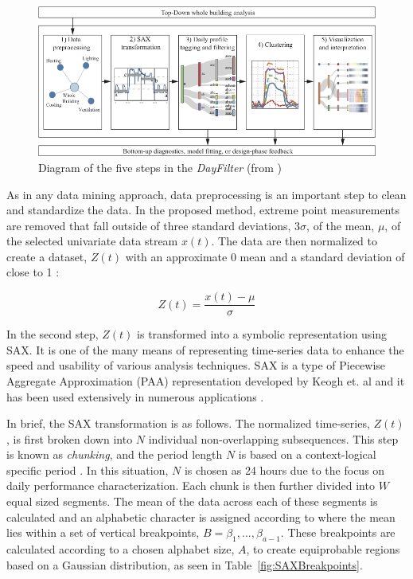 \begin{figure}[ht!]
\begin{center}
\includegraphics[width=1\columnwidth]{figures/ClusteringProcessDiagram_V4/ClusteringProcessDiagram_V4}
\caption{Diagram of the five steps in the \emph{DayFilter} (from \citep{miller_automated_2015})
\label{fig:process}%
}
\end{center}
\end{figure}

As in any data mining approach, data preprocessing is an important step to clean and standardize the data. In the proposed method, extreme point measurements are removed that fall outside of three standard deviations, 3$\sigma$, of the mean, $\mu$, of the selected univariate data stream $x(t)$. The data are then normalized to create a dataset, $Z(t)$ with an approximate 0 mean and a standard deviation of close to 1 \citep{goldin_similiarity_1995}:

\begin{equation}
Z(t)=\frac{x(t) -\mu}{\sigma}
\end{equation}

In the second step, $Z(t)$ is transformed into a symbolic representation using SAX. It is one of the many means of representing time-series data to enhance the speed and usability of various analysis techniques. SAX is a type of Piecewise Aggregate Approximation (PAA) representation developed by Keogh et. al and it has been used extensively in numerous applications \citep{lin_experiencing_2007}. 

In brief, the SAX transformation is as follows. The normalized time-series, $Z(t)$, is first broken down into $N$ individual non-overlapping subsequences. This step is known as \emph{chunking}, and the period length $N$ is based on a context-logical specific period \citep{lin_visualizing_2005}. In this situation, $N$ is chosen as 24 hours due to the focus on daily performance characterization.  Each chunk is then further divided into $W$ equal sized segments. The mean of the data across each of these segments is calculated and an alphabetic character is assigned according to where the mean lies within a set of vertical breakpoints, $B=\beta_1,...,\beta_{a-1}$. These breakpoints are calculated according to a chosen alphabet size, $A$, to create equiprobable regions based on a Gaussian distribution, as seen in Table~\ref{fig:SAXBreakpoints}.

